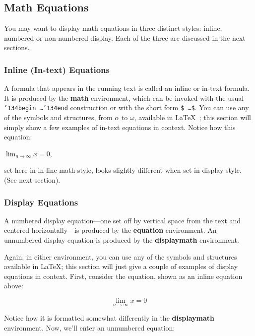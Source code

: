 \documentclass[sigconf]{acmart}
\begin{document}
\subsection{Math Equations}

You may want to display math equations in three distinct styles:
inline, numbered or non-numbered display.  Each of
the three are discussed in the next sections.

\subsubsection{Inline (In-text) Equations}

A formula that appears in the running text is called an
inline or in-text formula.  It is produced by the
\textbf{math} environment, which can be
invoked with the usual \texttt{{\char'134}begin\,\ldots{\char'134}end}
construction or with the short form \texttt{\$\,\ldots\$}. You
can use any of the symbols and structures,
from $\alpha$ to $\omega$, available in
\LaTeX~\cite{Lamport:LaTeX}; this section will simply show a
few examples of in-text equations in context. Notice how
this equation:

\begin{math}
  \lim_{n\rightarrow \infty}x=0
\end{math},

set here in in-line math style, looks slightly different when
set in display style.  (See next section).

\subsubsection{Display Equations}

A numbered display equation---one set off by vertical space from the
text and centered horizontally---is produced by the \textbf{equation}
environment. An unnumbered display equation is produced by the
\textbf{displaymath} environment.

Again, in either environment, you can use any of the symbols
and structures available in \LaTeX\@; this section will just
give a couple of examples of display equations in context.
First, consider the equation, shown as an inline equation above:

\begin{equation}
  \lim_{n\rightarrow \infty}x=0
\end{equation}

Notice how it is formatted somewhat differently in
the \textbf{displaymath}
environment.  Now, we'll enter an unnumbered equation:
\end{document}
